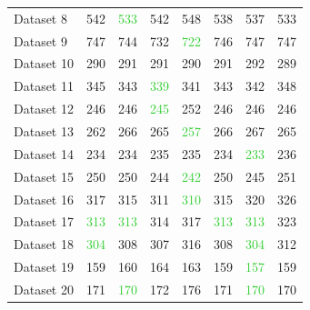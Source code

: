 \documentclass[xcolor=dvipsnames]{beamer}
\begin{document}
\begin{frame}
{\begin{tabular}{*{8}{l}}
 Dataset 8 &542 & \textcolor{LimeGreen}{533}&  542 & 548&  538 &  537 &  533\\
 Dataset 9 &\textcolor{ProcessBlue}{747} &  \textcolor{ProcessBlue}{744} &  \textcolor{ProcessBlue}{732} &  \textcolor{LimeGreen}{722}  & \textcolor{ProcessBlue}{746} &  \textcolor{ProcessBlue}{747}  & 747 \\
 Dataset 10 &290  & 291  & 291  & 290 &  291 &  292 &  289 \\
 Dataset 11 &\textcolor{ProcessBlue}{345} &  \textcolor{ProcessBlue}{343}  & \textcolor{LimeGreen}{339} &  \textcolor{ProcessBlue}{341}  & \textcolor{ProcessBlue}{343} &  \textcolor{ProcessBlue}{342}  & 348 \\
 Dataset 12 &\textcolor{ProcessBlue}{246}  & \textcolor{ProcessBlue}{246}  & \textcolor{LimeGreen}{245} &  252  & \textcolor{ProcessBlue}{246}  & \textcolor{ProcessBlue}{246}  & 246 \\
 Dataset 13 &\textcolor{ProcessBlue}{262} &  266 &  \textcolor{ProcessBlue}{265}  & \textcolor{LimeGreen}{257}  & 266  & 267 &  265 \\
 Dataset 14 &\textcolor{ProcessBlue}{234}  & \textcolor{ProcessBlue}{234}  & \textcolor{ProcessBlue}{235} &  \textcolor{ProcessBlue}{235}  & \textcolor{ProcessBlue}{234} &  \textcolor{LimeGreen}{233}  & 236 \\
Dataset 15 & \textcolor{ProcessBlue}{250}  & \textcolor{ProcessBlue}{250}  & \textcolor{ProcessBlue}{244}  & \textcolor{LimeGreen}{242}  & \textcolor{ProcessBlue}{250} &  \textcolor{ProcessBlue}{245} &  251 \\
 Dataset 16 & \textcolor{ProcessBlue}{317}  & \textcolor{ProcessBlue}{315}  & \textcolor{ProcessBlue}{311}  & \textcolor{LimeGreen}{310}  & \textcolor{ProcessBlue}{315}  & \textcolor{ProcessBlue}{320}  & 326 \\
 Dataset 17 & \textcolor{LimeGreen}{313}  & \textcolor{LimeGreen}{313} &  \textcolor{ProcessBlue}{314}  & \textcolor{ProcessBlue}{317} &  \textcolor{LimeGreen}{313}  & \textcolor{LimeGreen}{313}  & 323 \\
 Dataset 18 & \textcolor{LimeGreen}{304}  & \textcolor{ProcessBlue}{308} &  \textcolor{ProcessBlue}{307}  & 316 &  \textcolor{ProcessBlue}{308}  & \textcolor{LimeGreen}{304} &  312\\
 Dataset 19 & \textcolor{ProcessBlue}{159} &  160 &  164  & 163  & \textcolor{ProcessBlue}{159} &  \textcolor{LimeGreen}{157}  & 159 \\
 Dataset 20 & 171  & \textcolor{LimeGreen}{170} &  172  & 176  & 171  & \textcolor{LimeGreen}{170}  & 170 \\

\end{tabular}}
\end{frame}
\end{document}
